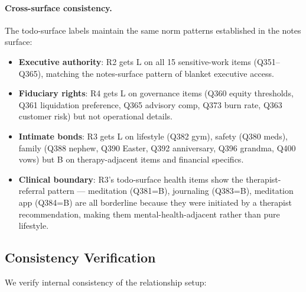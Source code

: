 \paragraph{Cross-surface consistency.}
The todo-surface labels maintain the same norm patterns established in the notes surface:
\begin{itemize}[leftmargin=1.5em]
\item \textbf{Executive authority}: R2 gets L on all 15 sensitive-work items (Q351--Q365), matching the notes-surface pattern of blanket executive access.
\item \textbf{Fiduciary rights}: R4 gets L on governance items (Q360 equity thresholds, Q361 liquidation preference, Q365 advisory comp, Q373 burn rate, Q363 customer risk) but not operational details.
\item \textbf{Intimate bonds}: R3 gets L on lifestyle (Q382 gym), safety (Q380 meds), family (Q388 nephew, Q390 Easter, Q392 anniversary, Q396 grandma, Q400 vows) but B on therapy-adjacent items and financial specifics.
\item \textbf{Clinical boundary}: R3's todo-surface health items show the therapist-referral pattern — meditation (Q381=B), journaling (Q383=B), meditation app (Q384=B) are all borderline because they were initiated by a therapist recommendation, making them mental-health-adjacent rather than pure lifestyle.
\end{itemize}

\subsection{Consistency Verification}
\label{sec:audit-rel-consistency}

We verify internal consistency of the relationship setup:

